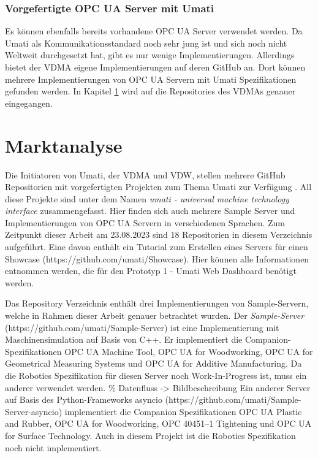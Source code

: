 \documentclass[a4paper, 12pt, oneside, toc=listofnumbered, bibliography=totoc]{scrbook}
\begin{document}
			\subsubsection{Vorgefertigte OPC UA Server mit Umati}
			
			Es können ebenfalls bereits vorhandene OPC UA Server verwendet werden. Da Umati als Kommunikationsstandard noch sehr jung ist und sich noch nicht Weltweit durchgesetzt hat, gibt es nur wenige Implementierungen. Allerdings bietet der VDMA eigene Implementierungen auf deren GitHub an. Dort können mehrere Implementierungen von OPC UA Servern mit Umati Spezifikationen gefunden werden. In Kapitel \ref{Marktanalyse} wird auf die Repositories des VDMAs genauer eingegangen.
	
	\section{Marktanalyse}\label{Marktanalyse}
		
		Die Initiatoren von Umati, der \ac{VDMA} und \ac{VDW}, stellen mehrere GitHub Repositorien mit vorgefertigten Projekten zum Thema Umati zur Verfügung \cite{noauthor_github_nodate}. All diese Projekte sind unter dem Namen \textit{umati - universal machine technology interface} zusammengefasst. Hier finden sich auch mehrere Sample Server und Implementierungen von OPC UA Servern in verschiedenen Sprachen. Zum Zeitpunkt dieser Arbeit am 23.08.2023 sind 18 Repositorien in diesem Verzeichnis aufgeführt. Eine davon enthält ein Tutorial zum Erstellen eines Servers für einen Showcase (https://github.com/umati/Showcase). Hier können alle Informationen entnommen werden, die für den Prototyp 1 - Umati Web Dashboard benötigt werden.
		
		Das Repository Verzeichnis enthält drei Implementierungen von Sample-Servern, welche in Rahmen dieser Arbeit genauer betrachtet wurden. Der \textit{Sample-Server} \linebreak (https://github.com/umati/Sample-Server) ist eine Implementierung mit Maschinensimulation auf Basis von C++. Er implementiert die Companion-Spezifikationen OPC UA Machine Tool, OPC UA for Woodworking, OPC UA for Geometrical Measuring Systems und OPC UA for Additive Manufacturing. Da die Robotics Spezifikation für diesen Server noch Work-In-Progress ist, muss ein anderer verwendet werden.
		\% Datenfluss -> Bildbeschreibung
		Ein anderer Server auf Basis des Python-Frameworks asyncio (https://github.com/umati/Sample-Server-asyncio) implementiert die Companion Spezifikationen OPC UA Plastic and Rubber, OPC UA for Woodworking, OPC 40451–1 Tightening und OPC UA for Surface Technology. Auch in diesem Projekt ist die Robotics Spezifikation noch nicht implementiert.
		
\end{document}
